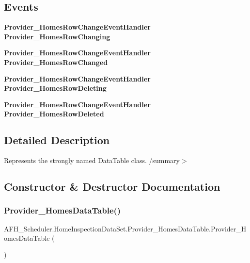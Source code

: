 \subsection*{Events}
\begin{DoxyCompactItemize}
\item 
\textbf{ Provider\+\_\+\+Homes\+Row\+Change\+Event\+Handler} \textbf{ Provider\+\_\+\+Homes\+Row\+Changing}
\item 
\textbf{ Provider\+\_\+\+Homes\+Row\+Change\+Event\+Handler} \textbf{ Provider\+\_\+\+Homes\+Row\+Changed}
\item 
\textbf{ Provider\+\_\+\+Homes\+Row\+Change\+Event\+Handler} \textbf{ Provider\+\_\+\+Homes\+Row\+Deleting}
\item 
\textbf{ Provider\+\_\+\+Homes\+Row\+Change\+Event\+Handler} \textbf{ Provider\+\_\+\+Homes\+Row\+Deleted}
\end{DoxyCompactItemize}


\subsection{Detailed Description}
Represents the strongly named Data\+Table class. /summary$>$ 

\subsection{Constructor \& Destructor Documentation}
\mbox{\label{class_a_f_h___scheduler_1_1_home_inspection_data_set_1_1_provider___homes_data_table_a5eed7baf37be9fa7a8e4da2393ba14ef}} 
\subsubsection{Provider\_HomesDataTable()\hspace{0.1cm}{\footnotesize\ttfamily [1/2]}}
{\footnotesize\ttfamily A\+F\+H\+\_\+\+Scheduler.\+Home\+Inspection\+Data\+Set.\+Provider\+\_\+\+Homes\+Data\+Table.\+Provider\+\_\+\+Homes\+Data\+Table (\begin{DoxyParamCaption}{ }\end{DoxyParamCaption})}

